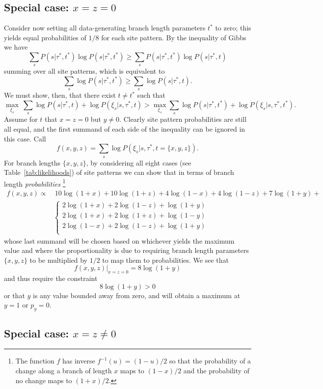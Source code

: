 \subsection{Special case: $x=z=0$}

Consider now setting all data-generating branch length parameters $t^*$ to zero; this yields equal probabilities of $1/8$ for each site pattern.
By the inequality of Gibbs we have
$$
\sum_{s} P(s|\tau^*,t^*)\log P(s|\tau^*,t^*) \geq \sum_{s} P(s|\tau^*,t^*)\log P(s|\tau^*,t)
$$
summing over all site patterns, which is equivalent to
$$
\sum_{s} \log P(s|\tau^*,t^*) \geq \sum_{s} \log P(s|\tau^*,t).
$$
We must show, then, that there exist $t\neq t^*$ such that
$$
\max_{\xi_s} \ \sum_{s} \log P(s | \tau^*, t) + \log P(\xi_s | s, \tau^*, t) > \max_{\xi_s} \sum_{s} \log P(s | \tau^*, t^*) + \log P(\xi_s | s, \tau^*, t^*).
$$
Assume for $t$ that $x=z=0$ but $y\neq 0$.
Clearly site pattern probabilities are still all equal, and the first summand of each side of the inequality can be ignored in this case.
Call
$$
f(x,y,z) = \sum_{s} \log P(\xi_s | s, \tau^*, t=\{x,y,z\}).
$$
For branch lengths $\{x,y,z\}$, by considering all eight cases (see Table~\ref{tab:likelihoods}) of site patterns we can show that in terms of branch length \emph{probabilities}%
    \footnote{The function $f$ has inverse $f^{-1}(u)=(1-u)/2$ so that the probability of a change along a branch of length $x$ maps to $(1-x)/2$ and the probability of no change maps to $(1+x)/2$.}
\begin{align}
f(x,y,z) \propto & \ 10\log(1+x)+10\log(1+z)+4\log(1-x)+4\log(1-z)+7\log(1+y)+\\
& \left\{ 
  \begin{array}{l}
  2\log(1+x)+2\log(1-z)+\log(1+y)\\
  2\log(1+x)+2\log(1+z)+\log(1-y)\\
  2\log(1-x)+2\log(1-z)+\log(1+y)\\
  \end{array} \right.
\end{align}
whose last summand will be chosen based on whichever yields the maximum value and where the proportionality is due to requiring branch length parameters $\{x,y,z\}$ to be multiplied by $1/2$ to map them to probabilities.
We see that
$$
f(x,y,z)|_{x=z=0} = 8\log(1+y)
$$
and thus require the constraint
$$
8\log(1+y) > 0
$$
or that $y$ is any value bounded away from zero, and will obtain a maximum at $y=1$ or $p_y=0$.

\subsection{Special case: $x=z\neq 0$}


